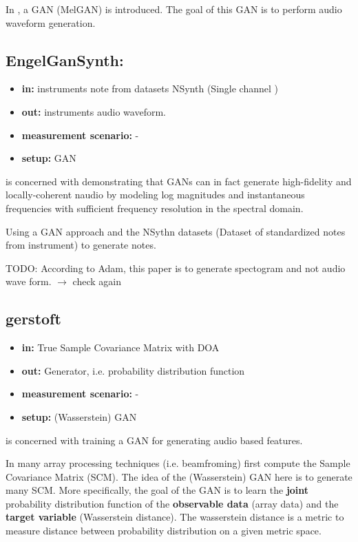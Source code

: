 \documentclass{article}
\begin{document}
In \cite{NEURIPS2019_6804c9bc}, a GAN (MelGAN) is introduced. The goal of this GAN is to perform audio waveform generation.

\subsection{EngelGanSynth:}

\begin{itemize}
    \item \textbf{in:} instruments note from datasets NSynth (Single channel )
    \item \textbf{out:} instruments audio waveform.
    \item \textbf{measurement scenario:} - 
    \item \textbf{setup:} GAN
\end{itemize}

\cite{engel2019gansynth} is concerned with demonstrating that GANs can in fact generate high-fidelity and locally-coherent naudio by modeling log magnitudes and instantaneous frequencies with sufficient frequency resolution in the spectral domain.

Using a GAN approach and the NSythn datasets (Dataset of standardized notes from instrument) to generate notes. 

TODO: According to Adam, this paper is to generate spectogram and not audio wave form. $\rightarrow$ check again

\subsection{gerstoft}

\begin{itemize}
    \item \textbf{in:} True Sample Covariance Matrix with DOA
    \item \textbf{out:} Generator, i.e. probability distribution function
    \item \textbf{measurement scenario:} -
    \item \textbf{setup:} (Wasserstein) GAN
\end{itemize}

\cite{gerstoft2020parametric} is concerned with training a GAN for generating audio based features. 

In many array processing techniques (i.e. beamfroming) first compute the Sample Covariance Matrix (SCM). The idea of the (Wasserstein) GAN here is to generate many SCM. More specifically, the goal of the GAN is to learn the \textbf{joint} probability distribution function of the \textbf{observable data} (array data) and the \textbf{target variable} (Wasserstein distance). The wasserstein distance is a metric to measure distance between probability distribution on a given metric space.
\end{document}
